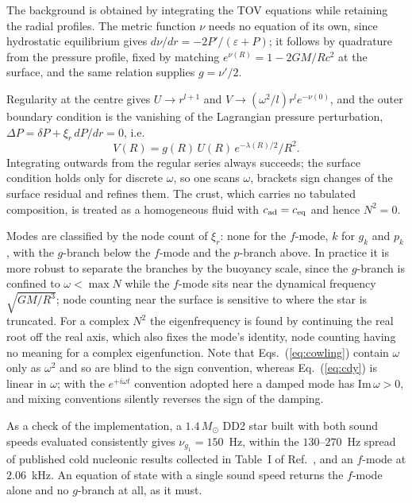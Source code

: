 \documentclass[aps,prd,twocolumn,superscriptaddress,nofootinbib,10pt]{revtex4-2}
\begin{document}
The background is obtained by integrating the TOV equations while retaining the
radial profiles. The metric function $\nu$ needs no equation of its own, since
hydrostatic equilibrium gives $d\nu/dr=-2P'/(\varepsilon+P)$; it follows by
quadrature from the pressure profile, fixed by matching $e^{\nu(R)}=1-2GM/Rc^{2}$
at the surface, and the same relation supplies $g=\nu'/2$.

Regularity at the centre gives $U\to r^{l+1}$ and
$V\to(\omega^{2}/l)r^{l}e^{-\nu(0)}$, and the outer boundary condition is the
vanishing of the Lagrangian pressure perturbation,
$\Delta P=\delta P+\xi_{r}\,dP/dr=0$, i.e.
\begin{equation}
  V(R) = g(R)\,U(R)\,e^{-\lambda(R)/2}/R^{2}.
\end{equation}
Integrating outwards from the regular series always succeeds; the surface
condition holds only for discrete $\omega$, so one scans $\omega$, brackets sign
changes of the surface residual and refines them. The crust, which carries no
tabulated composition, is treated as a homogeneous fluid with
$c_{\rm ad}=c_{\rm eq}$ and hence $N^{2}=0$.

Modes are classified by the node count of $\xi_{r}$: none for the $f$-mode, $k$
for $g_{k}$ and $p_{k}$, with the $g$-branch below the $f$-mode and the
$p$-branch above. In practice it is more robust to separate the branches by the
buoyancy scale, since the $g$-branch is confined to $\omega<\max N$ while the
$f$-mode sits near the dynamical frequency $\sqrt{GM/R^{3}}$; node counting near
the surface is sensitive to where the star is truncated. For a complex $N^{2}$
the eigenfrequency is found by continuing the real root off the real axis,
which also fixes the mode's identity, node counting having no meaning for a
complex eigenfunction. Note that Eqs.~(\ref{eq:cowling}) contain $\omega$ only
as $\omega^{2}$ and so are blind to the sign convention, whereas
Eq.~(\ref{eq:cdy}) is linear in $\omega$; with the $e^{+i\omega t}$ convention
adopted here a damped mode has $\mathrm{Im}\,\omega>0$, and mixing conventions
silently reverses the sign of the damping.

As a check of the implementation, a $1.4\,M_{\odot}$ DD2 star built with both
sound speeds evaluated consistently gives $\nu_{g_{1}}=150$~Hz, within the
$130$--$270$~Hz spread of published cold nucleonic results collected in Table~I
of Ref.~\cite{Jaikumar2021}, and an $f$-mode at $2.06$~kHz. An equation of
state with a single sound speed returns the $f$-mode alone and no $g$-branch at
all, as it must.
\end{document}
